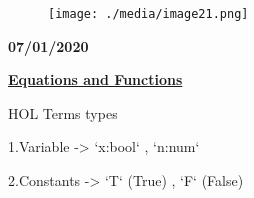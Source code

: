 \documentclass[12pt]{article}
\renewcommand{\_}{\kern-1.5pt\textunderscore\kern-1.5pt}
\begin{document}
\vspace{\baselineskip}

\vspace{\baselineskip}

\vspace{\baselineskip}



\begin{figure}[H]
	\begin{FlushLeft}		\texttt{[image: ./media/image21.png]}
	\end{FlushLeft}\end{figure}



\par


\vspace{\baselineskip}

\vspace{\baselineskip}

\vspace{\baselineskip}
\begin{FlushLeft}
{\fontsize{14pt}{16.8pt}\selectfont \textbf{07/01/2020}\par}
\end{FlushLeft}\par


\vspace{\baselineskip}
\begin{FlushLeft}
{\fontsize{14pt}{16.8pt}\selectfont \tab  \tab  \tab  \tab \par}
\end{FlushLeft}\par

{\fontsize{13pt}{15.6pt}\selectfont \textbf{\uline{Equations and Functions}}\par}\par


\vspace{\baselineskip}
{\fontsize{13pt}{15.6pt}\selectfont HOL Terms types\par}\par

{\fontsize{13pt}{15.6pt}\selectfont 1.Variable -> `x:bool` , `n:num`\par}\par

{\fontsize{13pt}{15.6pt}\selectfont 2.Constants -> `T` (True) , `F` (False)\par}\par
\end{document}
